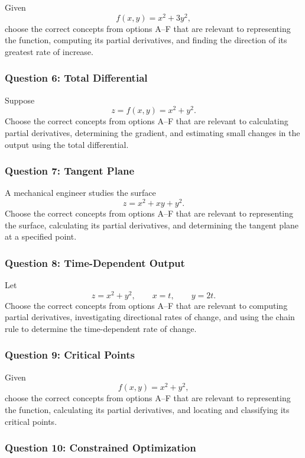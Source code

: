 \documentclass[a4paper,12pt]{article}
\theoremstyle{mystyle}
\numberwithin{equation}{section}
\numberwithin{theorem}{section}
\numberwithin{proposition}{section}
\numberwithin{example}{section}
\numberwithin{remark}{section}
\numberwithin{lemma}{section}
\numberwithin{corollary}{section}
\numberwithin{definition}{section}
\begin{document}
Given
\[
f(x,y)=x^2+3y^2,
\]
choose the correct concepts from options A--F that
are relevant to representing the function, computing
its partial derivatives, and finding the direction
of its greatest rate of increase.

\subsubsection*{Question 6: Total Differential}

Suppose
\[
z=f(x,y)=x^2+y^2.
\]
Choose the correct concepts from options A--F that
are relevant to calculating partial derivatives,
determining the gradient, and estimating small
changes in the output using the total differential.

\subsubsection*{Question 7: Tangent Plane}

A mechanical engineer studies the surface
\[
z=x^2+xy+y^2.
\]
Choose the correct concepts from options A--F that
are relevant to representing the surface, calculating
its partial derivatives, and determining the tangent
plane at a specified point.

\subsubsection*{Question 8: Time-Dependent Output}

Let
\[
z=x^2+y^2,\qquad x=t,\qquad y=2t.
\]
Choose the correct concepts from options A--F that
are relevant to computing partial derivatives,
investigating directional rates of change, and
using the chain rule to determine the time-dependent
rate of change.

\subsubsection*{Question 9: Critical Points}

Given
\[
f(x,y)=x^2+y^2,
\]
choose the correct concepts from options A--F that
are relevant to representing the function, calculating
its partial derivatives, and locating and classifying
its critical points.

\subsubsection*{Question 10: Constrained Optimization}
\end{document}
